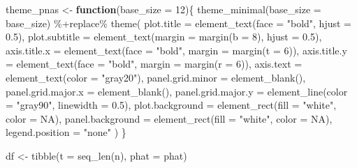 \documentclass[
  letterpaper,
  DIV=11,
  numbers=noendperiod]{scrreprt}
\newenvironment{Shaded}{\begin{snugshade}}{\end{snugshade}}
\newcommand{\AttributeTok}[1]{\textcolor[rgb]{0.40,0.45,0.13}{#1}}
\newcommand{\ConstantTok}[1]{\textcolor[rgb]{0.56,0.35,0.01}{#1}}
\newcommand{\ControlFlowTok}[1]{\textcolor[rgb]{0.00,0.23,0.31}{\textbf{#1}}}
\newcommand{\DecValTok}[1]{\textcolor[rgb]{0.68,0.00,0.00}{#1}}
\newcommand{\FloatTok}[1]{\textcolor[rgb]{0.68,0.00,0.00}{#1}}
\newcommand{\FunctionTok}[1]{\textcolor[rgb]{0.28,0.35,0.67}{#1}}
\newcommand{\NormalTok}[1]{\textcolor[rgb]{0.00,0.23,0.31}{#1}}
\newcommand{\OtherTok}[1]{\textcolor[rgb]{0.00,0.23,0.31}{#1}}
\newcommand{\SpecialCharTok}[1]{\textcolor[rgb]{0.37,0.37,0.37}{#1}}
\newcommand{\StringTok}[1]{\textcolor[rgb]{0.13,0.47,0.30}{#1}}
\begin{document}
\begin{Shaded}
\begin{Highlighting}[]
\NormalTok{theme\_pnas }\OtherTok{\textless{}{-}} \ControlFlowTok{function}\NormalTok{(}\AttributeTok{base\_size =} \DecValTok{12}\NormalTok{)\{}
\FunctionTok{theme\_minimal}\NormalTok{(}\AttributeTok{base\_size =}\NormalTok{ base\_size) }\SpecialCharTok{\%+replace\%}
\FunctionTok{theme}\NormalTok{(}
\AttributeTok{plot.title    =} \FunctionTok{element\_text}\NormalTok{(}\AttributeTok{face =} \StringTok{"bold"}\NormalTok{, }\AttributeTok{hjust =} \FloatTok{0.5}\NormalTok{),}
\AttributeTok{plot.subtitle =} \FunctionTok{element\_text}\NormalTok{(}\AttributeTok{margin =} \FunctionTok{margin}\NormalTok{(}\AttributeTok{b =} \DecValTok{8}\NormalTok{), }\AttributeTok{hjust =} \FloatTok{0.5}\NormalTok{),}
\AttributeTok{axis.title.x  =} \FunctionTok{element\_text}\NormalTok{(}\AttributeTok{face =} \StringTok{"bold"}\NormalTok{, }\AttributeTok{margin =} \FunctionTok{margin}\NormalTok{(}\AttributeTok{t =} \DecValTok{6}\NormalTok{)),}
\AttributeTok{axis.title.y  =} \FunctionTok{element\_text}\NormalTok{(}\AttributeTok{face =} \StringTok{"bold"}\NormalTok{, }\AttributeTok{margin =} \FunctionTok{margin}\NormalTok{(}\AttributeTok{r =} \DecValTok{6}\NormalTok{)),}
\AttributeTok{axis.text     =} \FunctionTok{element\_text}\NormalTok{(}\AttributeTok{color =} \StringTok{"gray20"}\NormalTok{),}
\AttributeTok{panel.grid.minor =} \FunctionTok{element\_blank}\NormalTok{(),}
\AttributeTok{panel.grid.major.x =} \FunctionTok{element\_blank}\NormalTok{(),}
\AttributeTok{panel.grid.major.y =} \FunctionTok{element\_line}\NormalTok{(}\AttributeTok{color =} \StringTok{"gray90"}\NormalTok{, }\AttributeTok{linewidth =} \FloatTok{0.5}\NormalTok{),}
\AttributeTok{plot.background   =} \FunctionTok{element\_rect}\NormalTok{(}\AttributeTok{fill =} \StringTok{"white"}\NormalTok{, }\AttributeTok{color =} \ConstantTok{NA}\NormalTok{),}
\AttributeTok{panel.background  =} \FunctionTok{element\_rect}\NormalTok{(}\AttributeTok{fill =} \StringTok{"white"}\NormalTok{, }\AttributeTok{color =} \ConstantTok{NA}\NormalTok{),}
\AttributeTok{legend.position   =} \StringTok{"none"}
\NormalTok{)}
\NormalTok{\}}

\NormalTok{df }\OtherTok{\textless{}{-}} \FunctionTok{tibble}\NormalTok{(}\AttributeTok{t =} \FunctionTok{seq\_len}\NormalTok{(n), }\AttributeTok{phat =}\NormalTok{ phat)}


\end{Highlighting}
\end{Shaded}
\end{document}
